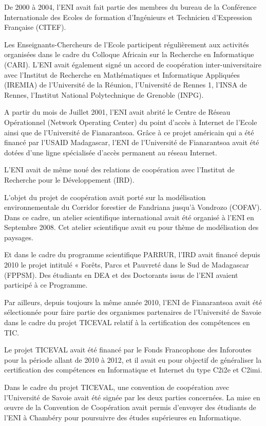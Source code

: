 \documentclass[12pt]{report}
\begin{document}
				De 2000 à 2004, l’ENI avait fait partie des membres du bureau de la Conférence Internationale des Ecoles de formation d’Ingénieurs et Technicien d’Expression Française (CITEF). 

				Les Enseignants-Chercheurs de l’Ecole participent régulièrement aux activités organisées dans le cadre du Colloque Africain sur la Recherche en Informatique (CARI). L’ENI avait également signé un accord de coopération inter-universitaire avec l’Institut de Recherche en Mathématiques et Informatique Appliquées (IREMIA) de l’Université de la Réunion, l’Université de Rennes 1, l’INSA de Rennes, l’Institut National Polytechnique de Grenoble (INPG). 

				A partir du mois de Juillet 2001, l’ENI avait abrité le Centre de Réseau Opérationnel (Network Operating Center) du point d’accès à Internet de l’Ecole ainsi que de l’Université de Fianarantsoa. Grâce à ce projet américain qui a été financé par l’USAID Madagascar, l’ENI de l’Université de Fianarantsoa avait été dotées d’une ligne spécialisée d’accès permanent au réseau Internet.

				L’ENI avait de même noué des relations de coopération avec l’Institut de Recherche pour le Développement (IRD).

				L’objet du projet de coopération avait porté sur la modélisation environnementale du Corridor forestier de Fandriana jusqu’à Vondrozo (COFAV). Dans ce cadre, un atelier scientifique international avait été organisé à l’ENI en Septembre 2008. Cet atelier scientifique avait eu pour thème de modélisation des paysages. 

				Et dans le cadre du programme scientifique PARRUR, l’IRD avait financé depuis 2010 le projet intitulé « Forêts, Parcs et Pauvreté dans le Sud de Madagascar (FPPSM). Des étudiants en DEA et des Doctorants issus de l’ENI avaient participé à ce Programme.

				Par ailleurs, depuis toujours la même année 2010, l’ENI de Fianarantsoa avait été sélectionnée pour faire partie des organismes partenaires de l’Université de Savoie dans le cadre du projet TICEVAL relatif à la certification des compétences en TIC.

				Le projet TICEVAL avait été financé par le Fonds Francophone des Inforoutes pour la période allant de 2010 à 2012, et il avait eu pour objectif de généraliser la certification des compétences en Informatique et Internet du type C2i2e et C2imi.

				Dans le cadre du projet TICEVAL, une convention de coopération avec l’Université de Savoie avait été signée par les deux parties concernées. La mise en œuvre de la Convention de Coopération avait permis d’envoyer des étudiants de l’ENI à Chambéry pour poursuivre des études supérieures en Informatique.
\end{document}

